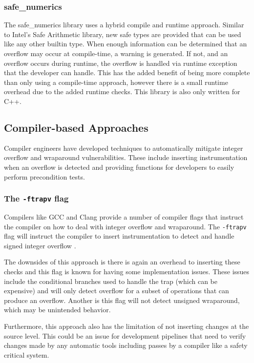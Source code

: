 \subsubsection{safe\_numerics}

The safe\_numerics library uses a hybrid compile and runtime approach. Similar to Intel's Safe Arithmetic library, new safe types are provided that can be used like any other builtin type. When enough information can be determined that an overflow may occur at compile-time, a warning is generated. If not, and an overflow occurs during runtime, the overflow is handled via runtime exception that the developer can handle. This has the added benefit of being more complete than only using a compile-time approach, however there is a small runtime overhead due to the added runtime checks. This library is also only written for C++.

\subsection{Compiler-based Approaches}

Compiler engineers have developed techniques to automatically mitigate integer overflow and wraparound vulnerabilities. These include inserting instrumentation when an overflow is detected and providing functions for developers to easily perform precondition tests.

\subsubsection{The \texttt{-ftrapv} flag}

Compilers like GCC and Clang provide a number of compiler flags that instruct the compiler on how to deal with integer overflow and wraparound. The \texttt{-ftrapv} flag will instruct the compiler to insert instrumentation to detect and handle signed integer overflow \cite{ftrapv}.

The downsides of this approach is there is again an overhead to inserting these checks and this flag is known for having some implementation issues. These issues include the conditional branches used to handle the trap (which can be expensive) and will only detect overflow for a subset of operations that can produce an overflow. Another is this flag will not detect unsigned wraparound, which may be unintended behavior.

Furthermore, this approach also has the limitation of not inserting changes at the source level. This could be an issue for development pipelines that need to verify changes made by any automatic tools including passes by a compiler like a safety critical system.

